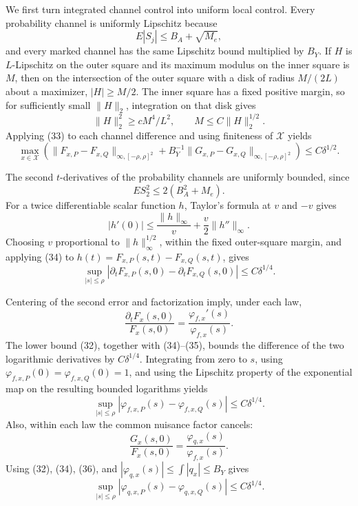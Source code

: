 We first turn integrated channel control into uniform local control.  Every probability channel is uniformly Lipschitz because
\[
E|S_j|\le B_A+\sqrt{M_e},
\]
and every marked channel has the same Lipschitz bound multiplied by \(B_Y\).  If \(H\) is \(L\)-Lipschitz on the outer square and its maximum modulus on the inner square is \(M\), then on the intersection of the outer square with a disk of radius \(M/(2L)\) about a maximizer, \(|H|\ge M/2\).  The inner square has a fixed positive margin, so for sufficiently small \(\|H\|_2\), integration on that disk gives
\[
\|H\|_2^2\ge cM^4/L^2,
\qquad M\le C\|H\|_2^{1/2}. \tag{33}
\]
Applying (33) to each channel difference and using finiteness of \(\mathcal X\) yields
\[
\max_{x\in\mathcal X}\left(
\|F_{x,P}-F_{x,Q}\|_{\infty,[-\rho,\rho]^2}
+B_Y^{-1}\|G_{x,P}-G_{x,Q}\|_{\infty,[-\rho,\rho]^2}
\right)\le C\delta^{1/2}. \tag{34}
\]

The second \(t\)-derivatives of the probability channels are uniformly bounded, since
\[
E S_2^2\le2(B_A^2+M_e).
\]
For a twice differentiable scalar function \(h\), Taylor's formula at \(v\) and \(-v\) gives
\[
|h'(0)|\le \frac{\|h\|_\infty}{v}+\frac v2\|h''\|_\infty.
\]
Choosing \(v\) proportional to \(\|h\|_\infty^{1/2}\), within the fixed outer-square margin, and applying (34) to \(h(t)=F_{x,P}(s,t)-F_{x,Q}(s,t)\), gives
\[
\sup_{|s|\le\rho}
|\partial_tF_{x,P}(s,0)-\partial_tF_{x,Q}(s,0)|
\le C\delta^{1/4}. \tag{35}
\]

Centering of the second error and factorization imply, under each law,
\[
\frac{\partial_tF_x(s,0)}{F_x(s,0)}
=\frac{\varphi_{f,x}'(s)}{\varphi_{f,x}(s)}.
\]
The lower bound (32), together with (34)--(35), bounds the difference of the two logarithmic derivatives by \(C\delta^{1/4}\).  Integrating from zero to \(s\), using \(\varphi_{f,x,P}(0)=\varphi_{f,x,Q}(0)=1\), and using the Lipschitz property of the exponential map on the resulting bounded logarithms yields
\[
\sup_{|s|\le\rho}
|\varphi_{f,x,P}(s)-\varphi_{f,x,Q}(s)|
\le C\delta^{1/4}. \tag{36}
\]
Also, within each law the common nuisance factor cancels:
\[
\frac{G_x(s,0)}{F_x(s,0)}
=\frac{\varphi_{q,x}(s)}{\varphi_{f,x}(s)}.
\]
Using (32), (34), (36), and \(|\varphi_{q,x}(s)|\le\int|q_x|\le B_Y\) gives
\[
\sup_{|s|\le\rho}
|\varphi_{q,x,P}(s)-\varphi_{q,x,Q}(s)|
\le C\delta^{1/4}. \tag{37}
\]

